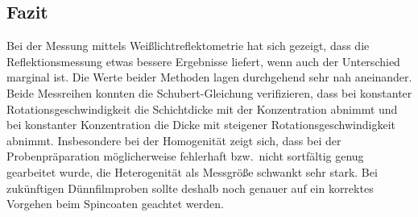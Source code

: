 \subsection{Fazit}
Bei der Messung mittels Weißlichtreflektometrie hat sich gezeigt, dass die Reflektionsmessung etwas bessere Ergebnisse liefert, wenn auch der Unterschied marginal ist. Die Werte beider Methoden lagen durchgehend sehr nah aneinander. Beide Messreihen konnten die Schubert-Gleichung verifizieren, dass bei konstanter Rotationsgeschwindigkeit die Schichtdicke mit der Konzentration abnimmt und bei konstanter Konzentration die Dicke mit steigener Rotationsgeschwindigkeit abnimmt. Insbesondere bei der Homogenität zeigt sich, dass bei der Probenpräparation möglicherweise fehlerhaft bzw.~nicht sortfältig genug gearbeitet wurde, die Heterogenität als Messgröße schwankt sehr stark. Bei zukünftigen Dünnfilmproben sollte deshalb noch genauer auf ein korrektes Vorgehen beim Spincoaten geachtet werden.